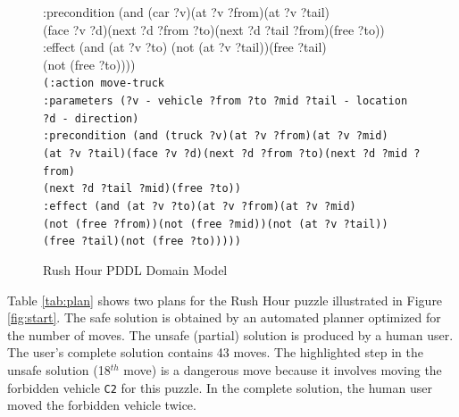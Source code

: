 \begin{figure}[!ht]
{{{{                \hspace*{35pt}:precondition (and (car ?v)(at ?v ?from)(at ?v ?tail)\\\hspace*{35pt}(face ?v ?d)(next ?d ?from ?to)(next ?d ?tail ?from)(free ?to))\\
                \hspace*{35pt}:effect (and (at ?v ?to) (not (at ?v ?tail))(free ?tail)\\\hspace*{35pt}(not (free ?to))))\\[15 pt]}
\texttt{\hspace*{35pt}(:action move-truck \\
                \hspace*{35pt}:parameters (?v - vehicle ?from ?to ?mid ?tail - location \\\hspace*{35pt}?d - direction)\\
                \hspace*{35pt}:precondition (and (truck ?v)(at ?v ?from)(at ?v ?mid)\\\hspace*{35pt}(at ?v ?tail)(face ?v ?d)(next ?d ?from ?to)(next ?d ?mid ?from)\\\hspace*{35pt}(next ?d ?tail ?mid)(free ?to))\\[0.25 pt]
                \hspace*{35pt}:effect (and (at ?v ?to)(at ?v ?from)(at ?v ?mid)\\\hspace*{35pt}(not (free ?from))(not (free ?mid))(not (at ?v ?tail))\\\hspace*{35pt}(free ?tail)(not (free ?to)))))
}
}
}
}
\caption{Rush Hour PDDL Domain Model}
\label{fig:domain}
\end{figure}

Table \ref{tab:plan} shows two plans for the Rush Hour puzzle illustrated in Figure \ref{fig:start}. The safe solution is obtained by an automated planner optimized for the number of moves. The unsafe (partial) solution is produced by a human user. The user's complete solution contains 43 moves. The highlighted step in the unsafe solution (18$^{th}$ move) is a dangerous move because it involves moving the forbidden vehicle \texttt{C2} for this puzzle. In the complete solution, the human user moved the forbidden vehicle twice.

